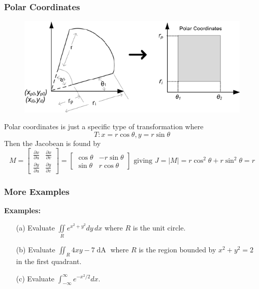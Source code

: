 \documentclass{beamer}
\begin{document}
\begin{frame}
\frametitle{Polar Coordinates}
\begin{figure}

	\includegraphics[height=.4\textheight]{polar.png}\\
	\hspace*{10pt}\hbox{}
\end{figure}
Polar coordinates is just a specific type of transformation where $$T: x=r\cos \theta, y=r\sin \theta$$ Then the Jacobean is found by
$$M = \begin{bmatrix}
\frac{\partial x}{\partial u} & 	\frac{\partial x}{\partial v}\\
\frac{\partial y}{\partial u} & 	\frac{\partial y}{\partial v}
\end{bmatrix}  = \begin{bmatrix} \cos \theta & -r\sin \theta \\ \sin \theta & r\cos \theta \end{bmatrix} \mbox{ giving } J=|M| = r\cos^2 \theta + r\sin^2 \theta = r$$

\end{frame}


\begin{frame}
\frametitle{More Examples}
\textbf{Examples:}
\begin{itemize}
	\item[(a)] Evaluate $\iint\limits_{R} e^{x^2+y^2} dy\,dx$ where $R$ is the unit circle.
	\item[(b)] Evaluate $\iint_{R} 4xy-7 \mathop{dA}$ where $R$ is the region bounded by $x^2+y^2 = 2$ in the first quadrant.
	\item[(c)] Evaluate $\int_{-\infty}^\infty e^{-x^2/2}dx$.
\end{itemize}
\end{frame}
\end{document}
